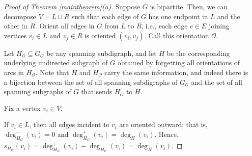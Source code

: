 \documentclass[12pt]{article}
\theoremstyle{definition}
\theoremstyle{remark}
\newcommand{\Or}{\mathcal{O}}
\begin{document}
\begin{proof}[Proof of Theorem \ref{maintheorem}(a)]
    Suppose $G$ is bipartite. Then, we can decompose $V = L \sqcup R$ such that each edge of $G$ has one endpoint in $L$ and the other in $R$. Orient all edges in $G$ from $L$ to $R$, i.e., each edge $e \in E$ joining vertices $v_i \in L$ and $v_j \in R$ is oriented $(v_i,v_j)$. Call this orientation $\mathcal{O}$.

    Let $H_{\mathcal{O}} \subseteq G_{\mathcal{O}}$ be any spanning subdigraph, and let $H$ be the corresponding underlying undirected subgraph of $G$ obtained by forgetting all orientations of arcs in $H_{\mathcal{O}}$. Note that $H$ and $H_{\Or}$ carry the same information, and indeed there is a bijection between the set of all spanning subdigraphs of $G_\Or$ and the set of all spanning subgraphs of $G$ that sends $H_\Or$ to $H$.
	
	Fix a vertex $v_i \in V$. 
    
    If $v_i \in L$, then all edges incident to $v_i$ are oriented outward; that is, $\deg_{H_\mathcal{O}}^-(v_i) = 0$ and $\deg_{H_{\mathcal{O}}}^+(v_i) = \deg_{H}(v_i)$. Hence, $s_{H_{\mathcal{O}}}(v_i) = \deg_{H_{\mathcal{O}}}^+(v_i)-\deg_{H_{\mathcal{O}}}^-(v_i)=\deg_{H}(v_i)$.
    

\end{proof}
\end{document}
